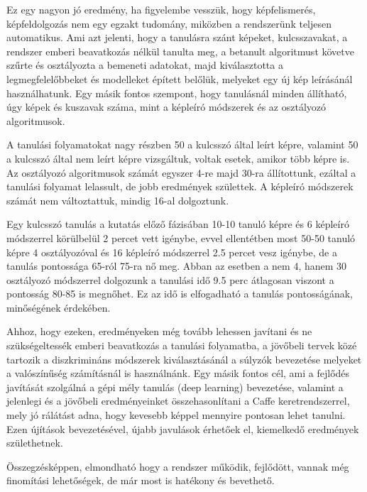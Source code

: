 \documentclass[12pt, a4paper, oneside]{book}
\theoremstyle{tetel}
\begin{document}
	Ez egy nagyon jó eredmény, ha figyelembe vesszük, hogy képfelismerés, képfeldolgozás nem egy egzakt tudomány, miközben a rendszerünk teljesen automatikus. Ami azt jelenti, hogy a tanulásra szánt képeket, kulcsszavakat, a rendszer emberi beavatkozás nélkül tanulta meg, a betanult algoritmust követve szűrte és osztályozta a bemeneti adatokat, majd kiválasztotta a legmegfelelőbbeket és modelleket épített belőlük, melyeket egy új kép leírásánál használhatunk. Egy másik fontos szempont, hogy tanulásnál minden állítható, úgy képek és kuszavak száma, mint a képleíró módszerek és az osztályozó algoritmusok. 

	A tanulási folyamatokat nagy részben 50 a kulcsszó által leírt képre, valamint 50 a kulcsszó által nem leírt képre vizsgáltuk, voltak esetek, amikor több képre is. Az osztályozó algoritmusok számát egyszer 4-re majd 30-ra állítottunk, ezáltal a tanulási folyamat lelassult, de jobb eredmények születtek. A képleíró módszerek számát nem változtattuk, mindig 16-al dolgoztunk.

Egy kulcsszó tanulás a kutatás előző fázisában 10-10 tanuló képre és 6 képleíró módszerrel körülbelül 2 percet vett igénybe, evvel ellentétben most 50-50 tanuló képre 4 osztályozóval és 16 képleíró módszerrel 2.5 percet vesz igénybe, de a tanulás pontossága 65-ról 75-ra nő meg. Abban az esetben a nem 4, hanem 30 osztályozó módszerrel dolgozunk a tanulási idő 9.5 perc átlagosan viszont a pontosság 80-85 is megnőhet. Ez az idő is elfogadható a tanulás pontosságának, minőségének érdekében.

	Ahhoz, hogy ezeken, eredményeken még tovább lehessen javítani és ne szükségeltessék emberi beavatkozás a tanulási folyamatba, a jövőbeli tervek közé tartozik a diszkrimináns módszerek kiválasztásánál a súlyzók bevezetése melyeket a valószínűség számításnál is használnánk. Egy másik fontos cél, ami a fejlődés javítását szolgálná a gépi mély tanulás (deep learning) \cite{19} bevezetése, valamint a jelenlegi és a jövőbeli eredményeinket összehasonlítani a Caffe \cite{20} keretrendszerrel, mely jó rálátást adna, hogy kevesebb képpel mennyire pontosan lehet tanulni. Ezen újítások bevezetésével, újabb javulások érhetőek el, kiemelkedő eredmények születhetnek.

	Összegzésképpen, elmondható hogy a rendszer működik, fejlődött, vannak még finomítási lehetőségek, de már most is hatékony és bevethető.



\newpage
 \listoffigures
\end{document}

